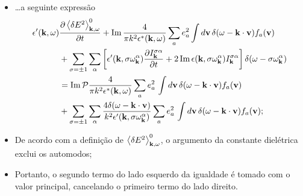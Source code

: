 \documentclass[10pt,aspectratio=1610,lualatex]{beamer}
\begin{document}
\begin{frame}
  \begin{itemize}
    \item \dots a seguinte expressão
    \begin{equation*}
      \label{noneigenmode-ql}
      \begin{split}
	\epsilon '({\bf k},\omega)
	&\frac{\partial \left< \delta E^2
	  \right>_{{\bf k},\omega}^0}{\partial t}
	+\mbox{Im}\,\frac{4}{\pi k^2\epsilon^*({\bf k},\omega)}
	\sum_ae_a^2 \int d{\bf v}\,
	\delta(\omega-{\bf k \cdot v})f_a({\bf v})\\
	&+\sum_{\sigma=\pm 1}\sum_\alpha\left[
	  \epsilon '({\bf k},\sigma\omega_{\bf k}^\alpha)
	  \frac{\partial I_{\bf k}^{\sigma \alpha}}{\partial t}
	  +2\,\mbox{Im}\,\epsilon({\bf k},\sigma\omega_{\bf k}^\alpha)
	  I_{\bf k}^{\sigma \alpha}\right]
	\delta(\omega-\sigma\omega_{\bf k}^\alpha)\\
	&=\mbox{Im}\,\mathcal{P}
	\frac{4}{\pi k^2\epsilon^{*}({\bf k},\omega)}
	\sum_a e^2_a\, \int d{\bf v}\,
	\delta(\omega-{\bf k \cdot v})f_a({\bf v})\\
	& +\sum_{\sigma=\pm 1}\sum_\alpha
	\frac{4\delta(\omega-{\bf k \cdot v})}
	{k^2\epsilon '({\bf k},\sigma\omega_{\bf k}^\alpha)}
	\sum_a e^2_a\, \int d{\bf v}\,
	\delta(\omega-{\bf k \cdot v})f_a({\bf v});
      \end{split}
    \end{equation*}
    \pause
    \item De acordo com a definição de
    $\left< \delta E^2\right>_{{\bf k},\omega}^0$,
    o argumento da constante dielétrica exclui os automodos;
    \vspace{0.15cm}
    \pause
    \item Portanto, o segundo termo do lado esquerdo da igualdade é tomado
    com o valor principal, cancelando o primeiro termo do lado direito.
  \end{itemize}
\end{frame}
\end{document}
